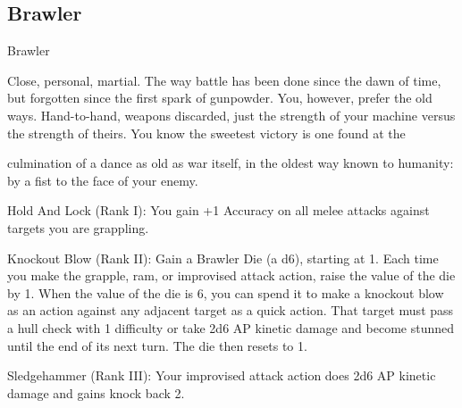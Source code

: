 \subsection{Brawler}

                                                     Brawler

Close, personal, martial. The way battle has been done since the dawn of time, but forgotten since the first
spark of gunpowder. You, however, prefer the old ways. Hand-to-hand, weapons discarded, just the
strength of your machine versus the strength of theirs. You know the sweetest victory is one found at the

culmination of a dance as old as war itself, in the oldest way known to humanity: by a fist to the face of
your enemy.

Hold And Lock (Rank I): You gain +1 Accuracy on all melee attacks against targets you are
grappling.

Knockout Blow (Rank II): Gain a Brawler Die (a d6), starting at 1. Each time you make the
grapple, ram, or improvised attack action, raise the value of the die by 1. When the value of the
die is 6, you can spend it to make a knockout blow as an action against any adjacent target as a
quick action. That target must pass a hull check with 1 difficulty or take 2d6 AP kinetic damage
and become stunned until the end of its next turn. The die then resets to 1.

Sledgehammer (Rank III): Your improvised attack action does 2d6 AP kinetic damage and gains
knock back 2.

